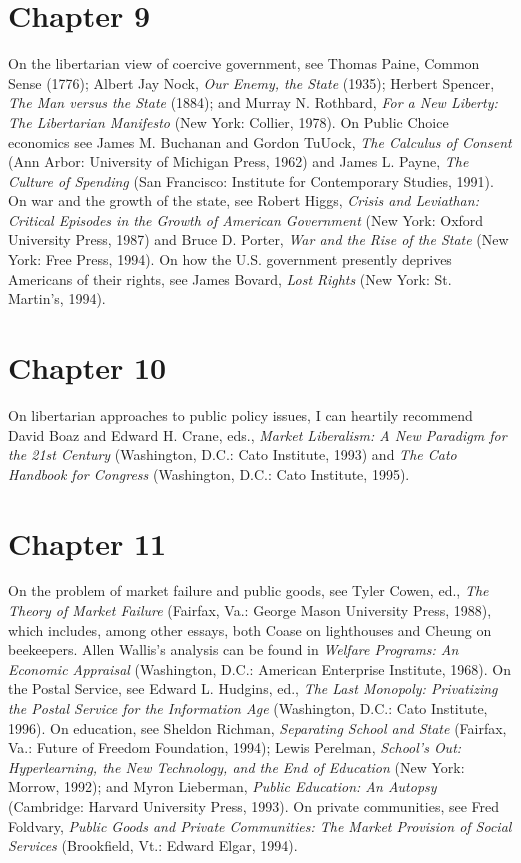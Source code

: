 \section*{Chapter 9}
On the libertarian view of coercive government, see Thomas Paine, Common Sense (1776); Albert Jay Nock, \textit{Our Enemy, the State} (1935); Herbert
Spencer, \textit{The Man versus the State} (1884); and Murray N. Rothbard, \textit{For a New
Liberty: The Libertarian Manifesto} (New York: Collier, 1978). On Public
Choice economics see James M. Buchanan and Gordon TuUock, \textit{The Calculus
of Consent} (Ann Arbor: University of Michigan Press, 1962) and James L.
Payne, \textit{The Culture of Spending} (San Francisco: Institute for Contemporary
Studies, 1991). On war and the growth of the state, see Robert Higgs, \textit{Crisis
and Leviathan: Critical Episodes in the Growth of American Government} (New
York: Oxford University Press, 1987) and Bruce D. Porter, \textit{War and the Rise
of the State} (New York: Free Press, 1994). On how the U.S. government presently deprives Americans of their rights, see James Bovard, \textit{Lost Rights} (New York: St. Martin's, 1994).
\section*{Chapter 10}
On libertarian approaches to public policy issues, I can heartily recommend David Boaz and Edward H. Crane, eds., \textit{Market Liberalism: A New Paradigm for the 21st Century} (Washington, D.C.: Cato Institute, 1993) and \textit{The
Cato Handbook for Congress} (Washington, D.C.: Cato Institute, 1995).
\section*{Chapter 11}
On the problem of market failure and public goods, see Tyler Cowen, ed.,
\textit{The Theory of Market Failure} (Fairfax, Va.: George Mason University Press,
1988), which includes, among other essays, both Coase on lighthouses and
Cheung on beekeepers. Allen Wallis's analysis can be found in \textit{Welfare Programs: An Economic Appraisal} (Washington, D.C.: American Enterprise Institute, 1968). On the Postal Service, see Edward L. Hudgins, ed., \textit{The Last
Monopoly: Privatizing the Postal Service for the Information Age} (Washington,
D.C.: Cato Institute, 1996). On education, see Sheldon Richman, \textit{Separating
School and State} (Fairfax, Va.: Future of Freedom Foundation, 1994); Lewis
Perelman, \textit{School's Out: Hyperlearning, the New Technology, and the End of Education} (New York: Morrow, 1992); and Myron Lieberman, \textit{Public Education: An
Autopsy} (Cambridge: Harvard University Press, 1993). On private communities, see Fred Foldvary, \textit{Public Goods and Private Communities: The Market
Provision of Social Services} (Brookfield, Vt.: Edward Elgar, 1994).
